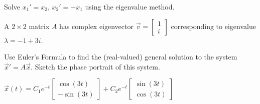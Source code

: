 \begin{exercise}\ansMark%
Solve $x_1' = x_2$, $x_2' = -x_1$ using the eigenvalue method.
\end{exercise}

\begin{exercise}
A $2\times 2$ matrix $A$ has complex eigenvector $\displaystyle \vec{v}=\begin{bmatrix} 1\\ i \end{bmatrix}$ corresponding to eigenvalue $\lambda=-1+3i$. %
\begin{tasks}
\task Use Euler's Formula to find the (real-valued) general solution to the system $\vec{x}'=A\vec{x}$.
\task Sketch the phase portrait of this system.
\end{tasks}
\end{exercise}
\comboSol{%
}
{%
$\vec{x}(t) = C_1e^{-t}\left[\begin{smallmatrix} \cos(3t)\\ -\sin(3t) \end{smallmatrix}\right] + C_2e^{-t}\left[\begin{smallmatrix} \sin(3t)\\ \cos(3t) \end{smallmatrix}\right]$  \hfill{}\hfill\hfill
}

